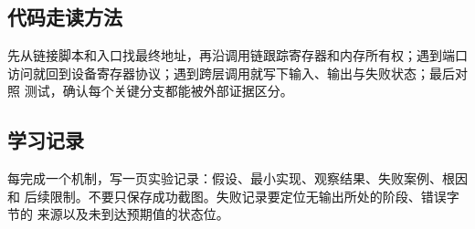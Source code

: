 \subsection{代码走读方法}

先从链接脚本和入口找最终地址，再沿调用链跟踪寄存器和内存所有权；遇到端口
访问就回到设备寄存器协议；遇到跨层调用就写下输入、输出与失败状态；最后对照
测试，确认每个关键分支都能被外部证据区分。

\subsection{学习记录}

每完成一个机制，写一页实验记录：假设、最小实现、观察结果、失败案例、根因和
后续限制。不要只保存成功截图。失败记录要定位无输出所处的阶段、错误字节的
来源以及未到达预期值的状态位。

